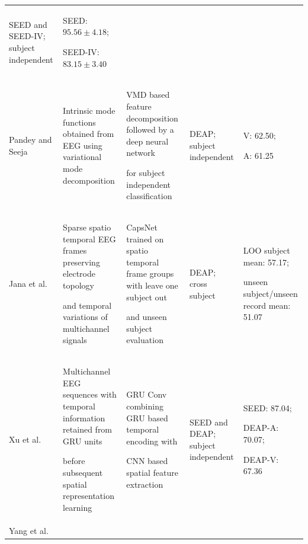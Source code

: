 \documentclass[ASNA,twocolumn]{USG}
\newcommand{\lightrowsep}{%
  \arrayrulecolor{lightrowgray}%
  \specialrule{0.30pt}{3.5pt}{3.5pt}%
  \arrayrulecolor{black}%
}
\begin{document}
\begin{table}
\begin{tabularx}{\textheight}{>{\raggedright\arraybackslash}p{3.15cm}>{\raggedright\arraybackslash}X>{\raggedright\arraybackslash}X>{\raggedright\arraybackslash}p{3.45cm}>{\raggedright\arraybackslash}p{5.0cm}}
SEED and SEED-IV; subject independent &

SEED: $95.56 \pm 4.18$;

SEED-IV: $83.15 \pm 3.40$ \\

\lightrowsep

Pandey and Seeja \cite{pandey2022subject} &

Intrinsic mode functions obtained from EEG using variational mode decomposition &

VMD based feature decomposition followed by a deep neural network

for subject independent classification &

DEAP; subject independent &

V: 62.50;

A: 61.25 \\

\lightrowsep

Jana et al. \cite{jana2022capsule} &

Sparse spatio temporal EEG frames preserving electrode topology

and temporal variations of multichannel signals &

CapsNet trained on spatio temporal frame groups with leave one subject out

and unseen subject evaluation &

DEAP; cross subject &

LOO subject mean: 57.17;

unseen subject/unseen record mean: 51.07 \\

\lightrowsep

Xu et al. \cite{xu2023subject} &

Multichannel EEG sequences with temporal information retained from GRU units

before subsequent spatial representation learning &

GRU Conv combining GRU based temporal encoding with

CNN based spatial feature extraction &

SEED and DEAP; subject independent &

SEED: 87.04;

DEAP-A: 70.07;

DEAP-V: 67.36 \\

\lightrowsep

Yang et al. \cite{yang2019multi} &


\end{tabularx}
\end{table}
\end{document}
